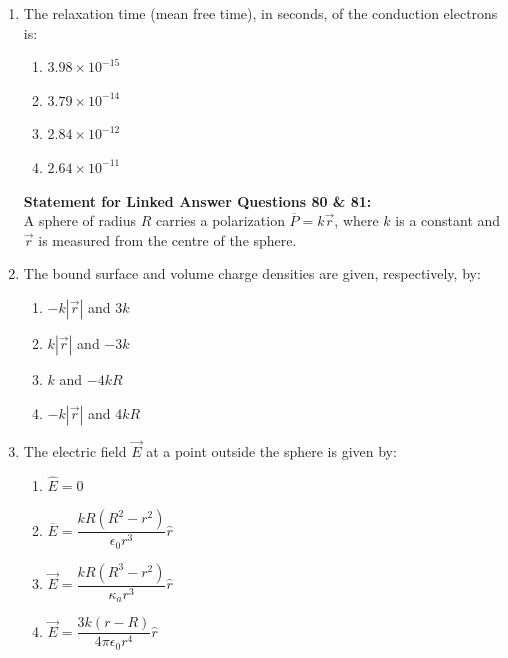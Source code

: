 \documentclass[journal,13pt,onecolumn]{IEEEtran}
\begin{document}
\begin{enumerate}[itemsep = 1em]
\item The relaxation time (mean free time), in seconds, of the conduction electrons is:

\hfill{}

\begin{multicols}{4}
\begin{enumerate}
    \item $3.98 \times 10^{-15}$
    \item $3.79 \times 10^{-14}$
    \item $2.84 \times 10^{-12}$
    \item $2.64 \times 10^{-11}$
\end{enumerate}
\end{multicols}

\vspace{2em}

\textbf{Statement for Linked Answer Questions 80 \& 81:} \\
A sphere of radius $R$ carries a polarization $\overline{P} = k \vec{r}$, where $k$ is a constant and $\vec{r}$ is measured from the centre of the sphere.

\item The bound surface and volume charge densities are given, respectively, by:

\hfill{}

\begin{multicols}{4}
\begin{enumerate}
    \item $-k |\vec{r}|$ and $3k$
    \item $k |\vec{r}|$ and $-3k$
    \item $k$ and $-4kR$
    \item $-k |\vec{r}|$ and $4kR$
\end{enumerate}
\end{multicols}

\item The electric field $\vec{E}$ at a point outside the sphere is given by:

\hfill{}

\begin{multicols}{4}
\begin{enumerate}
    \item $\hat{E} = 0$
    \item $\overline{E} = \dfrac{k R (R^2 - r^2)}{\epsilon_0 r^3} \hat{r}$
    \item $\vec{E} = \dfrac{k R (R^3 - r^2)}{\kappa_a r^3} \hat{r}$
    \item $\vec{E} = \dfrac{3k (r - R)}{4 \pi \epsilon_0 r^4} \hat{r}$
\end{enumerate}
\end{multicols}


\end{enumerate}
\end{document}
